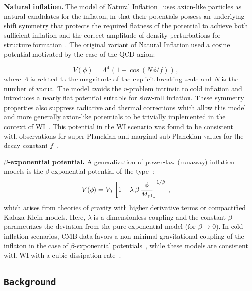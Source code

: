 \documentclass[a4paper,11pt]{article}
\begin{document}
{\bf Natural inflation.}  The model of Natural Inflation~\cite{Freese:1990rb} uses axion-like particles as natural candidates for the inflaton, in that their potentials possess an underlying shift symmetry that protects the required flatness of the potential to achieve both sufficient inflation and the correct amplitude of density perturbations for structure formation~\cite{Adams:1990pn,Montefalcone:2022owy}.  The original variant of Natural Inflation used a cosine potential  motivated by the case of the QCD axion:

\begin{equation}
    \label{eq:natural_potential}
    V(\phi)= \Lambda^4\,\left(1+\cos(N\phi/f)\right)\,,
\end{equation}
where $\Lambda$ is related to the magnitude of the explicit breaking scale and $N$ is the number of vacua. The model avoids the $\eta$-problem intrinsic to cold inflation and introduces a nearly flat potential suitable for slow-roll inflation. These symmetry properties also suppress radiative and thermal corrections which allow this model and more generally axion-like potentials to be trivially implemented in the context of WI~\cite{Visinelli:2011jy, Mishra:2011vh,Kamali:2019ppi,Berghaus:2019whh}. This potential in the WI scenario was found to be consistent with observations for super-Planckian and marginal sub-Planckian values for the
decay constant $f$~\cite{Correa:2022ngq,Montefalcone:2022jfw}.

{\bf $\beta$-exponential potential.} A generalization of power-law (runaway) inflation models is the $\beta$-exponential potential of the type~\cite{Alcaniz:2006nu}:
\begin{equation}
    \label{eq:betaexponential}
    V(\phi)= V_0\,\left[1-\lambda\,\beta\,\frac{\phi}{M_{\rm pl}}\right]^{1/\beta}\,,
\end{equation}
which arises from theories of gravity with higher derivative terms or compactified Kaluza-Klein models. Here, $\lambda$ is a dimensionless coupling and the constant $\beta$ parametrizes the deviation from the pure exponential model (for $\beta\to0$). In cold inflation scenarios, CMB data favors a non-minimal gravitational coupling of the inflaton in the case of $\beta$-exponential potentials~\cite{dosSantos:2021vis}, while these models are consistent with WI with a cubic dissipation rate~\cite{Santos:2022exm}.

\subsection{\texttt{Background}
\label{sec:background}}
\end{document}
